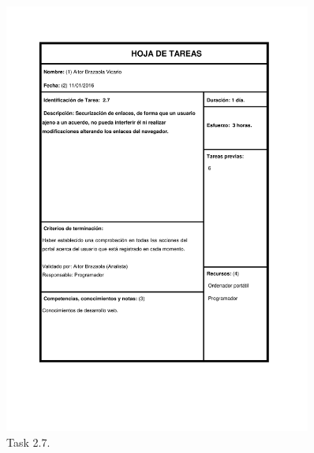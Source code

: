 \documentclass{DeustoFDP}
\begin{document}
\begin{figure}[H]
	\centering
	\includegraphics[width=0.9\textwidth]{fig/Tareas/27}
	\caption{Task 2.7.}
	\label{fig:t27}
\end{figure}
\end{document}
